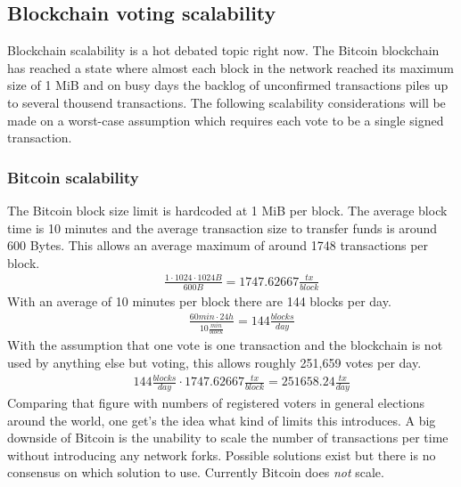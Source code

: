\subsection{Blockchain voting scalability}
Blockchain scalability is a hot debated topic right now. The Bitcoin blockchain has reached a state where almost each block in the network reached its maximum size of 1 MiB and on busy days the backlog of unconfirmed transactions piles up to several thousend transactions. The following scalability considerations will be made on a worst-case assumption which requires each vote to be a single signed transaction.
\subsubsection{Bitcoin scalability}
The Bitcoin block size limit is hardcoded at 1 MiB per block. The average block time is 10 minutes and the average transaction size to transfer funds is around 600 Bytes. This allows an average maximum of around 1748 transactions per block.
\begin{eqnarray}
& & \frac{1 \cdot 1024 \cdot 1024 B}{600 B} = 1747.62667 \frac {tx} {block}
\end{eqnarray}
With an average of 10 minutes per block there are 144 blocks per day.
\begin{eqnarray}
& & \frac{60 min \cdot 24 h}{10 \frac{min}{block}} = 144 \frac {blocks}{day}
\end{eqnarray}
With the assumption that one vote is one transaction and the blockchain is not used by anything else but voting, this allows roughly 251,659 votes per day.
\begin{eqnarray}
& & 144 \frac {blocks}{day} \cdot 1747.62667 \frac {tx} {block} = 251658.24 \frac{tx}{day}
\end{eqnarray}
Comparing that figure with numbers of registered voters in general elections around the world, one get's the idea what kind of limits this introduces. A big downside of Bitcoin is the unability to scale the number of transactions per time without introducing any network forks. Possible solutions exist but there is no consensus on which solution to use. Currently Bitcoin does \textit{not} scale.
